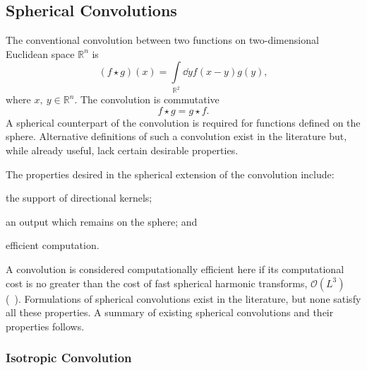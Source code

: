 \subsection{Spherical Convolutions}\label{sec:chapter2_spherical_convolutions}

The conventional convolution between two functions on two-dimensional Euclidean space \(\mathbb{R}^{n}\) is
%
\begin{equation}
	(f \star g)(x)
	= \int\limits_{\mathbb{R}^{2}} \dd{y} f(x-y) g(y),
\end{equation}
%
where \(x,\ y \in \mathbb{R}^{n}\).
The convolution is commutative
%
\begin{equation}
	f \star g
	= g \star f.
\end{equation}
%
A spherical counterpart of the convolution is required for functions defined on the sphere.
Alternative definitions of such a convolution exist in the literature but, while already useful, lack certain desirable properties.

The properties desired in the spherical extension of the convolution include:
%
\begin{inparaenum}[(i)]
	\item the support of directional kernels;
	\item an output which remains on the sphere; and
	\item efficient computation.
\end{inparaenum}
%
A convolution is considered computationally efficient here if its computational cost is no greater than the cost of fast spherical harmonic transforms, \ie{} \(\mathcal{O}(L^{3})\) (\eg{}~\autocite{Driscoll1994,McEwen2011}).
Formulations of spherical convolutions exist in the literature, but none satisfy all these properties.
A summary of existing spherical convolutions and their properties follows.

\subsubsection{Isotropic Convolution}

